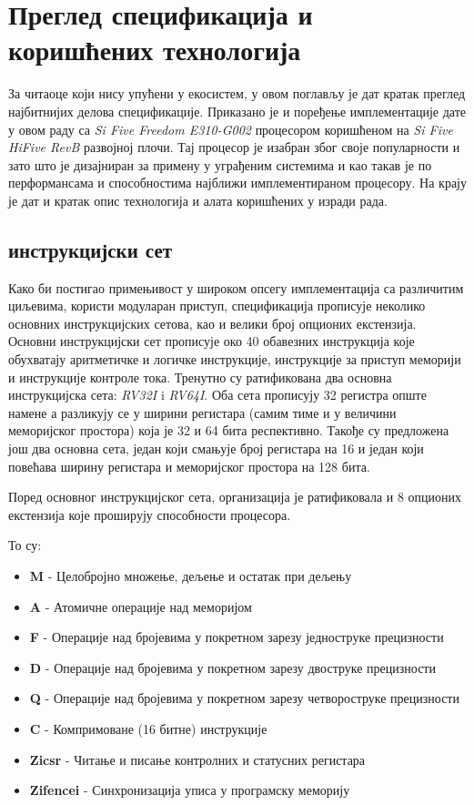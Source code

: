 \chapter{Преглед спецификација и коришћених технологија}

За читаоце који нису упућени у  екосистем, у овом поглављу је дат кратак преглед најбитнијих делова спецификације.
Приказано је и поређење имплементације дате у овом раду са \textit{Si Five Freedom E310-G002} процесором коришћеном на \textit{Si Five HiFive RevB} \cite{hifive_site} развојној плочи.
Тај процесор је изабран због своје популарности и зато што је дизајниран за примену у уграђеним системима и као такав је по перформансама и способностима најближи имплементираном процесору.
На крају је дат и кратак опис технологија и алата коришћених у изради рада.

\section{ инструкцијски сет}

Како би постигао примењивост у широком опсегу имплементација са различитим циљевима,  користи модуларан приступ, спецификација \cite{riscv_spec} прописује неколико основних инструкцијских сетова, као и велики број опционих екстензија.
Основни инструкцијски сет прописује око 40 обавезних инструкција које обухватају аритметичке и логичке инструкције, инструкције за приступ меморији и инструкције контроле тока.
Тренутно су ратификована два основна инструкцијска сета: \textit{RV32I} i \textit{RV64I}. Оба сета прописују 32 регистра опште намене а разликују се у ширини регистара (самим тиме и у величини меморијског простора) која је 32 и 64 бита респективно. Такође су предложена још два основна сета, један који смањује број регистара на 16 и један који повећава ширину регистара и меморијског простора на 128 бита.

Поред основног инструкцијског сета,  организација је ратификовала и 8 опционих екстензија које проширују способности процесора.

То су:
\begin{itemize}
	\item \textbf{M} - Целобројно множење, дељење и остатак при дељењу
	\item \textbf{A} - Атомичне операције над меморијом
	\item \textbf{F} - Операције над бројевима у покретном зарезу једноструке прецизности
	\item \textbf{D} - Операције над бројевима у покретном зарезу двоструке прецизности
	\item \textbf{Q} - Операције над бројевима у покретном зарезу четвороструке прецизности
	\item \textbf{C} - Компримоване (16 битне) инструкције
	\item \textbf{Zicsr} - Читање и писање контролних и статусних регистара
	\item \textbf{Zifencei} - Синхронизација уписа у програмску меморију
\end{itemize}

